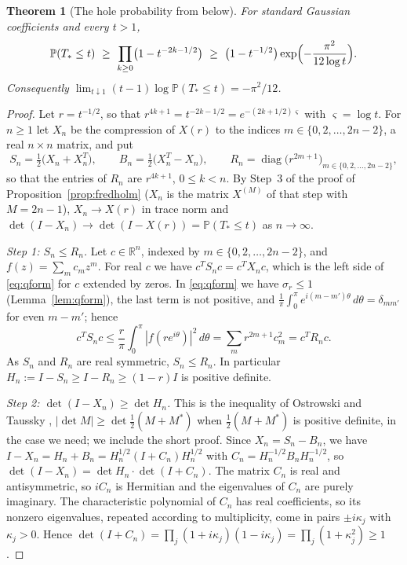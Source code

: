 \documentclass[11pt]{amsart}
\newtheorem{theorem}{Theorem}[section]
\theoremstyle{definition}
\theoremstyle{remark}
\numberwithin{equation}{section}
\newcommand{\R}{\mathbb{R}}
\newcommand{\PP}{\mathbb{P}}
\begin{document}
\begin{theorem}[The hole probability from below]\label{thm:lower}
For standard Gaussian coefficients and every $t>1$,
\[
\PP(T_*\le t)\ \ge\ \prod_{k\ge0}\bigl(1-t^{-2k-1/2}\bigr)\ \ge\ \bigl(1-t^{-1/2}\bigr)\exp\Bigl(-\frac{\pi^2}{12\log t}\Bigr).
\]
Consequently $\lim_{t\downarrow1}(t-1)\log\PP(T_*\le t)=-\pi^2/12$.
\end{theorem}

\begin{proof}
Let $r=t^{-1/2}$, so that $r^{4k+1}=t^{-2k-1/2}=e^{-(2k+1/2)\varsigma}$ with $\varsigma=\log t$. For $n\ge1$ let $X_n$ be the compression of $X(r)$ to the indices $m\in\{0,2,\dots,2n-2\}$, a real $n\times n$ matrix, and put
\[
S_n=\tfrac12\bigl(X_n+X_n^T\bigr),\qquad B_n=\tfrac12\bigl(X_n^T-X_n\bigr),\qquad R_n=\operatorname{diag}\bigl(r^{2m+1}\bigr)_{m\in\{0,2,\dots,2n-2\}},
\]
so that the entries of $R_n$ are $r^{4k+1}$, $0\le k<n$.
By Step~3 of the proof of Proposition~\ref{prop:fredholm} ($X_n$ is the matrix $X^{(M)}$ of that step with $M=2n-1$), $X_n\to X(r)$ in trace norm and $\det(I-X_n)\to\det(I-X(r))=\PP(T_*\le t)$ as $n\to\infty$.

\emph{Step 1: $S_n\le R_n$.} Let $c\in\R^n$, indexed by $m\in\{0,2,\dots,2n-2\}$, and $f(z)=\sum_mc_mz^m$. For real $c$ we have $c^TS_nc=c^TX_nc$, which is the left side of \eqref{eq:qform} for $c$ extended by zeros. In \eqref{eq:qform} we have $\sigma_r\le1$ (Lemma~\ref{lem:qform}), the last term is not positive, and $\frac1\pi\int_0^\pi e^{i(m-m')\theta}\,d\theta=\delta_{mm'}$ for even $m-m'$; hence
\[
c^TS_nc\le\frac r\pi\int_0^\pi|f(re^{i\theta})|^2\,d\theta=\sum_mr^{2m+1}c_m^2=c^TR_nc .
\]
As $S_n$ and $R_n$ are real symmetric, $S_n\le R_n$. In particular $H_n:=I-S_n\ge I-R_n\ge(1-r)I$ is positive definite.

\emph{Step 2: $\det(I-X_n)\ge\det H_n$.} This is the inequality of Ostrowski and Taussky \cite{OT}, $|\det M|\ge\det\frac12(M+M^*)$ when $\frac12(M+M^*)$ is positive definite, in the case we need; we include the short proof. Since $X_n=S_n-B_n$, we have $I-X_n=H_n+B_n=H_n^{1/2}(I+C_n)H_n^{1/2}$ with $C_n=H_n^{-1/2}B_nH_n^{-1/2}$, so $\det(I-X_n)=\det H_n\cdot\det(I+C_n)$. The matrix $C_n$ is real and antisymmetric, so $iC_n$ is Hermitian and the eigenvalues of $C_n$ are purely imaginary. The characteristic polynomial of $C_n$ has real coefficients, so its nonzero eigenvalues, repeated according to multiplicity, come in pairs $\pm i\kappa_j$ with $\kappa_j>0$. Hence $\det(I+C_n)=\prod_j(1+i\kappa_j)(1-i\kappa_j)=\prod_j(1+\kappa_j^2)\ge1$.


\end{proof}
\end{document}
